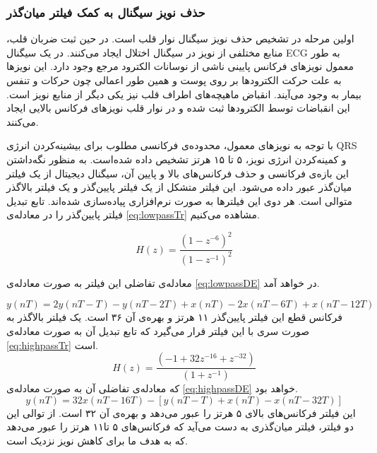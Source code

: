 		\subsubsection{حذف نویز سیگنال به کمک فیلتر میان‌گذر}
		اولین مرحله در تشخیص  حذف نویز سیگنال نوار قلب است. در حین ثبت ضربان قلب، منابع مختلفی از نویز در سیگنال اختلال ایجاد می‌کنند. در یک سیگنال ECG به طور معمول نویزهای فرکانس پایینی ناشی از نوسانات الکترود مرجع وجود دارد. این نویزها به علت حرکت الکترودها بر روی پوست و همین طور اعمالی چون حرکات و تنفس بیمار به وجود می‌آیند. انقباض ماهیچه‌های اطراف قلب نیز یکی دیگر از منابع نویز است. این انقباضات توسط الکترودها ثبت شده و در نوار قلب نویزهای فرکانس بالایی ایجاد می‌کنند.\cite{Joshi2013}
		
		با توجه به نویزهای معمول، محدوده‌ی فرکانسی مطلوب برای بیشینه‌کردن انرژی QRS و کمینه‌کردن انرژی نویز، ۵ تا ۱۵ هرتز تشخیص داده شده‌است.\cite{Pan1985} به منظور نگه‌داشتن این بازه‌ی فرکانسی و حذف فرکانس‌های بالا و پایین آن، سیگنال دیجیتال از یک فیلتر میان‌گذر عبور داده می‌شود. این فیلتر متشکل از یک فیلتر پایین‌گذر و یک فیلتر بالاگذر متوالی است. هر دوی این فیلترها به صورت نرم‌افزاری پیاده‌سازی شده‌اند.
تابع تبدیل فیلتر پایین‌گذر را در معادله‌ی \ref{eq:lowpassTr} مشاهده می‌کنیم.

\begin{equation}
	H(z) = \frac{{(1-z^{-6})}^2}{{(1-z^{-1})}^2}
\label{eq:lowpassTr}
\end{equation}
	
	معادله‌ی تفاضلی این فیلتر به صورت معادله‌ی \ref{eq:lowpassDE} در خواهد آمد.
	
\begin{equation}
	y(nT) = 2y(nT-T) - y(nT-2T) + x(nT) - 2x(nT-6T) + x(nT-12T) 
\label{eq:lowpassDE}
\end{equation}
فرکانس قطع این فیلتر پایین‌گذر ۱۱ هرتز و بهره‌ی آن ۳۶ است. یک فیلتر بالاگذر به صورت سری با این فیلتر قرار می‌گیرد که تابع تبدیل آن به صورت معادله‌ی \ref{eq:highpassTr} است.
\begin{equation}
	H(z) = \frac{{(-1+32z^{-16}+z^{-32})}}{{(1+z^{-1})}}
\label{eq:highpassTr}
\end{equation}
که معادله‌ی تفاضلی آن به صورت معادله‌ی \ref{eq:highpassDE} خواهد بود.
 \begin{equation}
	y(nT) = 32x(nT-16T) - [y(nT-T) + x(nT) - x(nT-32T)]
\label{eq:highpassDE}
\end{equation}
این فیلتر فرکانس‌های بالای ۵ هرتز را عبور می‌دهد و بهره‌ی آن ۳۲ است. از توالی این دو فیلتر، فیلتر میان‌گذری به دست می‌آید که فرکانس‌های ۵ تا۱۱ هرتز را عبور می‌دهد که به هدف ما برای کاهش نویز نزدیک است. 

